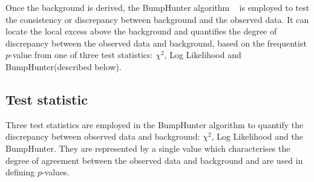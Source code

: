 Once the background is derived, the BumpHunter algorithm ~\cite{Aaltonen:2008vt,Choudalakis:2011bh} is employed to test the consistency or discrepancy between background and the observed data.
It can locate the local excess above the background and quantifies the degree of discrepancy between the observed data and background, based on the frequentist $p$-value from one of three test statistics: $\chi^{2}$, Log Likelihood and BumpHunter(described below).

%
%


\subsection{Test statistic}
Three test statistics are employed in the BumpHunter algorithm to quantify the discrepancy between observed data and background: $\chi^{2}$, Log Likelihood and the BumpHunter. They are represented by a single value which characterises the degree of agreement between the observed data and background and are used in defining $p$-values.

